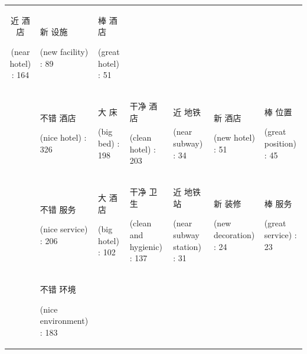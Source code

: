 \documentclass[smallextended,natbib]{svjour3}       %
\begin{document}
\begin{landscape}
\begin{table}[p]
{\begin{tabular}{|c|l|l|l|l|l|l|}
          \begin{CJK}{UTF8}{gbsn}近 酒店\end{CJK} (near hotel) : 164 &
          \begin{CJK}{UTF8}{gbsn}新 设施\end{CJK} (new facility) : 89 &
          \begin{CJK}{UTF8}{gbsn}棒 酒店\end{CJK} (great hotel) : 51 \\
         &
          \begin{CJK}{UTF8}{gbsn}不错 酒店\end{CJK} (nice hotel) : 326 &
          \begin{CJK}{UTF8}{gbsn}大 床\end{CJK} (big bed) : 198 &
          \begin{CJK}{UTF8}{gbsn}干净 酒店\end{CJK} (clean hotel) : 203 &
          \begin{CJK}{UTF8}{gbsn}近 地铁\end{CJK} (near subway) : 34 &
          \begin{CJK}{UTF8}{gbsn}新 酒店\end{CJK} (new hotel) : 51 &
          \begin{CJK}{UTF8}{gbsn}棒 位置\end{CJK} (great position) : 45 \\
         &
          \begin{CJK}{UTF8}{gbsn}不错 服务\end{CJK} (nice service) : 206 &
          \begin{CJK}{UTF8}{gbsn}大 酒店\end{CJK} (big hotel) : 102 &
          \begin{CJK}{UTF8}{gbsn}干净 卫生\end{CJK} (clean and hygienic) : 137 &
          \begin{CJK}{UTF8}{gbsn}近 地铁站\end{CJK} (near subway station) : 31 &
          \begin{CJK}{UTF8}{gbsn}新 装修\end{CJK} (new decoration) : 24 &
          \begin{CJK}{UTF8}{gbsn}棒 服务\end{CJK} (great service) : 23 \\
         &
          \begin{CJK}{UTF8}{gbsn}不错 环境\end{CJK} (nice environment) : 183 &

\end{tabular}}
\end{table}
\end{landscape}
\end{document}
